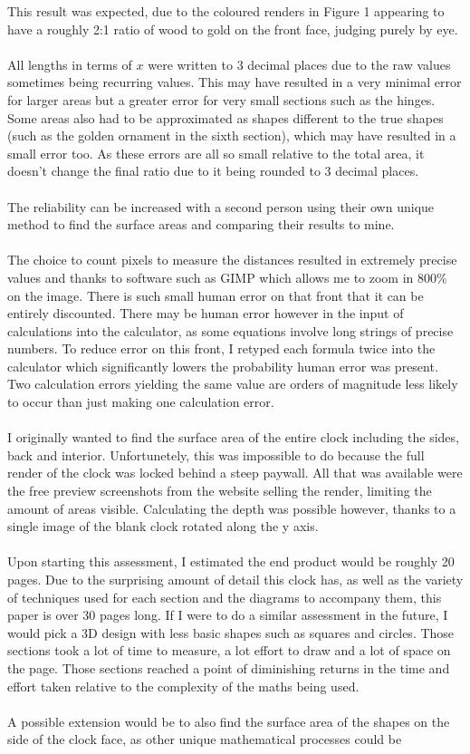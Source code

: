 \documentclass[a4paper,12pt]{article}
\begin{document}
This result was expected, due to the coloured renders in Figure 1 appearing to have a roughly 2:1 ratio of wood to gold on the front face, judging purely by eye. \\\\All lengths in terms of $x$ were written to 3 decimal places due to the raw values sometimes being recurring values. This may have resulted in a very minimal error for larger areas but a greater error for very small sections such as the hinges. Some areas also had to be approximated as shapes different to the true shapes (such as the golden ornament in the sixth section), which may have resulted in a small error too.
As these errors are all so small relative to the total area, it doesn't change the final ratio due to it being rounded to 3 decimal places. \\\\The reliability can be increased with a second person using their own unique method to find the surface areas and comparing their results to mine. \\\\The choice to count pixels to measure the distances resulted in extremely precise values and thanks to software such as GIMP which allows me to zoom in 800\% on the image. There is such small human error on that front that it can be entirely discounted. There may be human error however in the input of calculations into the calculator, as some equations involve long strings of precise numbers. To reduce error on this front, I retyped each formula twice into the calculator which significantly lowers the probability human error was present. Two calculation errors yielding the same value are orders of magnitude less likely to occur than just making one calculation error. \\\\I originally wanted to find the surface area of the entire clock including the sides, back and interior. Unfortunetely, this was impossible to do because the full render of the clock was locked behind a steep paywall. All that was available were the free preview screenshots from the website selling the render, limiting the amount of areas visible. Calculating the depth was possible however, thanks to a single image of the blank clock rotated along the y axis.\\\\Upon starting this assessment, I estimated the end product would be roughly 20 pages. Due to the surprising amount of detail this clock has, as well as the variety of techniques used for each section and the diagrams to accompany them, this paper is over 30 pages long. If I were to do a similar assessment in the future, I would pick a 3D design with less basic shapes such as squares and circles. Those sections took a lot of time to measure, a lot effort to draw and a lot of space on the page. Those sections reached a point of diminishing returns in the time and effort taken relative to the complexity of the maths being used. \\\\A possible extension would be to also find the surface area of the shapes on the side of the clock face, as other unique mathematical processes could be 
\end{document}

